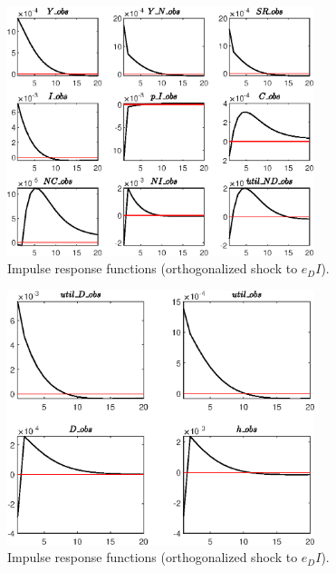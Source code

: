\begin{figure}[H]
\centering 
\includegraphics[width=0.80\textwidth]{BRS_sectoral/graphs/BRS_sectoral_IRF_e_DI1}
\caption{Impulse response functions (orthogonalized shock to ${e_DI}$).}\label{Fig:IRF:e_DI:1}
\end{figure}
 
\begin{figure}[H]
\centering 
\includegraphics[width=0.80\textwidth]{BRS_sectoral/graphs/BRS_sectoral_IRF_e_DI2}
\caption{Impulse response functions (orthogonalized shock to ${e_DI}$).}\label{Fig:IRF:e_DI:2}
\end{figure}
 
